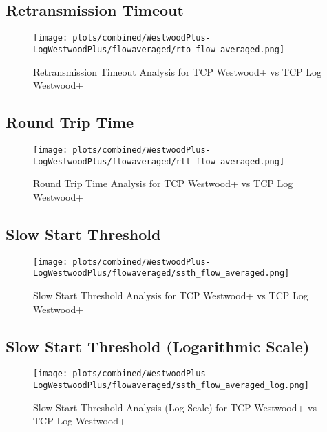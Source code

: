 \documentclass[12pt,a4paper]{report}
\begin{document}
\newpage

\newpage
\subsection{Retransmission Timeout}
\begin{figure}[H]
\centering
\texttt{[image: plots/combined/WestwoodPlus-LogWestwoodPlus/flowaveraged/rto\_flow\_averaged.png]}
\caption{Retransmission Timeout Analysis for TCP Westwood+ vs TCP Log Westwood+}
\label{fig:WestwoodPlus-LogWestwoodPlus_rto}
\end{figure}

\newpage

\newpage
\subsection{Round Trip Time}
\begin{figure}[H]
\centering
\texttt{[image: plots/combined/WestwoodPlus-LogWestwoodPlus/flowaveraged/rtt\_flow\_averaged.png]}
\caption{Round Trip Time Analysis for TCP Westwood+ vs TCP Log Westwood+}
\label{fig:WestwoodPlus-LogWestwoodPlus_rtt}
\end{figure}

\newpage

\newpage
\subsection{Slow Start Threshold}
\begin{figure}[H]
\centering
\texttt{[image: plots/combined/WestwoodPlus-LogWestwoodPlus/flowaveraged/ssth\_flow\_averaged.png]}
\caption{Slow Start Threshold Analysis for TCP Westwood+ vs TCP Log Westwood+}
\label{fig:WestwoodPlus-LogWestwoodPlus_ssth}
\end{figure}

\newpage

\subsection{Slow Start Threshold (Logarithmic Scale)}
\begin{figure}[H]
\centering
\texttt{[image: plots/combined/WestwoodPlus-LogWestwoodPlus/flowaveraged/ssth\_flow\_averaged\_log.png]}
\caption{Slow Start Threshold Analysis (Log Scale) for TCP Westwood+ vs TCP Log Westwood+}
\label{fig:WestwoodPlus-LogWestwoodPlus_ssth_log}
\end{figure}
\end{document}
